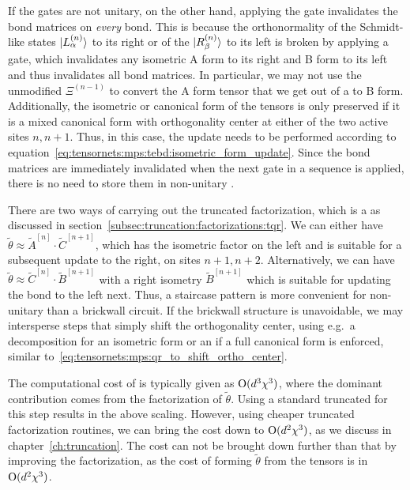 If the gates are not unitary, on the other hand, applying the gate invalidates the bond matrices on \emph{every} bond.
%
This is because the orthonormality of the Schmidt-like states $\ket{L^{(n)}_\alpha}$ to its right or of the $\ket{R^{(n)}_\beta}$ to its left is broken by applying a gate, which invalidates any isometric A form to its right and B form to its left and thus invalidates all bond matrices.
%
In particular, we may not use the unmodified $\Xi^{(n-1)}$ to convert the A form tensor that we get out of a  to B form.
%
Additionally, the isometric or canonical form of the  tensors is only preserved if it is a mixed canonical form with orthogonality center at either of the two active sites $n,n+1$.
%
Thus, in this case, the update needs to be performed according to equation~\eqref{eq:tensornets:mps:tebd:isometric_form_update}.
%
Since the bond matrices are immediately invalidated when the next gate in a sequence is applied, there is no need to store them in non-unitary .

%
There are two ways of carrying out the truncated factorization, which is a  as discussed in section~\ref{subsec:truncation:factorizations:tqr}.
%
We can either have $\tilde\theta \approx \tilde{A}^{[n]} \cdot \tilde{C}^{[n+1]}$, which has the isometric factor on the left and is suitable for a subsequent update to the right, on sites $n+1,n+2$.
%
Alternatively, we can have $\tilde\theta \approx \tilde{C}^{[n]} \cdot \tilde{B}^{[n+1]}$ with a right isometry $\tilde{B}^{[n+1]}$ which is suitable for updating the bond to the left next.
%
Thus, a staircase pattern is more convenient for non-unitary  than a brickwall circuit.
%
If the brickwall structure is unavoidable, we may intersperse steps that simply shift the orthogonality center, using e.g.~a  decomposition for an isometric form or an  if a full canonical form is enforced, similar to~\eqref{eq:tensornets:mps:qr_to_shift_ortho_center}.

The computational cost of  is typically given as $\mathrm{O}(d^3 \chi^3)$, where the dominant contribution comes from the factorization of $\tilde{\theta}$.
%
Using a standard truncated  for this step results in the above scaling.
%
However, using cheaper truncated factorization routines, we can bring the cost down to $\mathrm{O}(d^2 \chi^3)$, as we discuss in chapter~\ref{ch:truncation}.
%
The cost can not be brought down further than that by improving the factorization, as the cost of forming $\tilde{\theta}$ from the  tensors is in $\mathrm{O}(d^2 \chi^3)$.


